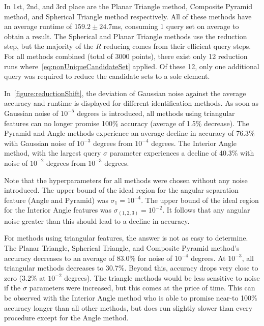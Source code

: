 In 1st, 2nd, and 3rd place are the Planar Triangle method, Composite Pyramid method, and Spherical Triangle method
respectively.
All of these methods have an average runtime of $159.2 \pm 24.7$ms, consuming 1 query set on average to obtain a result.
The Spherical and Planar Triangle methods use the  reduction step, but the majority of the $R$ reducing
comes from their efficient query steps.
For all methods combined (total of 3000 points), there exist only 12 reduction runs
where~\autoref{eq:nonUniqueCandidateSet} applied.
Of these 12, only one additional query was required to reduce the candidate sets to a sole element.

In~\autoref{figure:reductionShift}, the deviation of Gaussian noise against the average accuracy and runtime is
displayed for different identification methods.
As soon as Gaussian noise of $10^{-5}$ degrees is introduced, all methods using triangular features can no longer
promise 100\% accuracy (average of 1.5\% decrease).
The Pyramid and Angle methods experience an average decline in accuracy of 76.3\% with Gaussian noise of $10^{-3}$
degrees from $10^{-4}$ degrees.
The Interior Angle method, with the largest query $\sigma$ parameter experiences a decline of 40.3\% with noise of $10^{-2}$
degrees from $10^{-3}$ degrees.

Note that the hyperparameters for all methods were chosen without any noise introduced.
The upper bound of the ideal region for the angular separation feature (Angle and Pyramid) was $\sigma_1 = 10^{-4}$.
The upper bound of the ideal region for the Interior Angle features was $\sigma_{(1, 2, 3)} = 10^{-2}$.
It follows that any angular noise greater than this should lead to a decline in accuracy.

For methods using triangular features, the answer is not as easy to determine.
The Planar Triangle, Spherical Triangle, and Composite Pyramid method's accuracy decreases to an average of
83.0\% for noise of $10^{-4}$ degrees.
At $10^{-3}$, all triangular methods decreases to 30.7\%.
Beyond this, accuracy drops very close to zero (3.2\% at $10^{-2}$ degrees).
The triangle methods would be less sensitive to noise if the $\sigma$ parameters were increased, but this comes at the
price of time.
This can be observed with the Interior Angle method who is able to promise near-to 100\% accuracy longer than all other
methods, but does run slightly slower than every procedure except for the Angle method.

